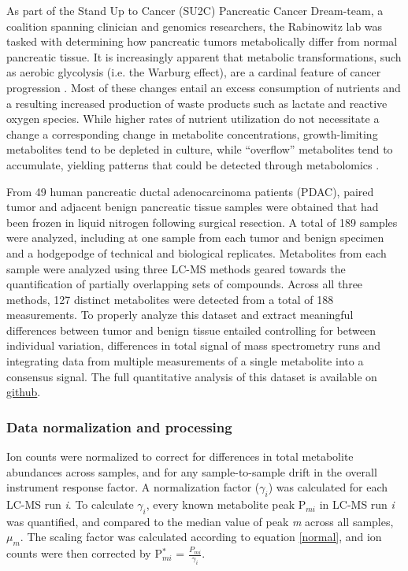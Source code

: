 As part of the Stand Up to Cancer (SU2C) Pancreatic Cancer Dream-team, a coalition spanning clinician and genomics researchers, the Rabinowitz lab was tasked with determining how pancreatic tumors metabolically differ from normal pancreatic tissue.  It is increasingly apparent that metabolic transformations, such as aerobic glycolysis (i.e. the Warburg effect), are a cardinal feature of cancer progression \cite{VanderHeiden:2009gq, Hanahan:2011gu}.  Most of these changes entail an excess consumption of nutrients and a resulting increased production of waste products such as lactate and reactive oxygen species.  While higher rates of nutrient utilization do not necessitate a change a corresponding change in metabolite concentrations, growth-limiting metabolites tend to be depleted in culture, while ``overflow'' metabolites tend to accumulate, yielding patterns that could be detected through metabolomics \cite{Boer:2010fb}.

From 49 human pancreatic ductal adenocarcinoma patients (PDAC), paired tumor and adjacent benign pancreatic tissue samples were obtained that had been frozen in liquid nitrogen following surgical resection.  A total of 189 samples were analyzed, including at one sample from each tumor and benign specimen and a hodgepodge of technical and biological replicates.  Metabolites from each sample were analyzed using three LC-MS methods geared towards the quantification of partially overlapping sets of compounds. Across all three methods, 127 distinct metabolites were detected from a total of 188 measurements.  To properly analyze this dataset and extract meaningful differences between tumor and benign tissue entailed controlling for between individual variation, differences in total signal of mass spectrometry runs and integrating data from multiple measurements of a single metabolite into a consensus signal. The full quantitative analysis of this dataset is available on \href{https://github.com/shackett/Pancreatic_tumor_metabolomics}{github}.

\subsubsection{Data normalization and processing}

Ion counts were normalized to correct for differences in total metabolite abundances across samples, and for any sample-to-sample drift in the overall instrument response factor.  A normalization factor ($\gamma_{i}$) was calculated for each LC-MS run \textit{i}.  To calculate $\gamma_{i}$, every known metabolite peak P$_{mi}$ in LC-MS run \textit{i} was quantified, and compared to the median value of peak \textit{m} across all samples, $\mu_{m}$.  The scaling factor was calculated according to equation \ref{normal}, and ion counts were then corrected by P$^{*}_{mi}$ = $\frac{P_{mi}}{\gamma_{i}}$.

